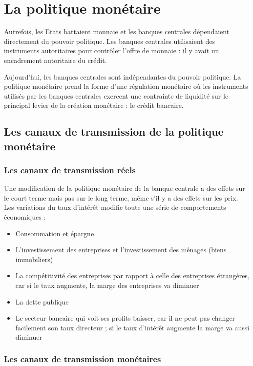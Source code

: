 \chapter{La politique monétaire}

Autrefois, les Etats battaient monnaie et les banques centrales dépendaient directement du pouvoir politique. Les banques centrales utilisaient des instruments autoritaires pour contrôler l'offre de monnaie : il y avait un encadrement autoritaire du crédit.

Aujourd'hui, les banques centrales sont indépendantes du pouvoir politique. La politique monétaire prend la forme d'une régulation monétaire où les instruments utilisés par les banques centrales exercent une contrainte de liquidité sur le principal levier de la création monétaire : le crédit bancaire.

\section{Les canaux de transmission de la politique monétaire}

	\subsection{Les canaux de transmission réels}

Une modification de la politique monétaire de la banque centrale a des effets sur le court terme mais pas sur le long terme, même s'il y a des effets sur les prix.  Les variations du taux d'intérêt modifie toute une série de comportements économiques :

\begin{itemize}
	\item Consommation et épargne
	\item L'investissement des entreprises et l'investissement des ménages (biens immobiliers)
	\item La compétitivité des entreprises par rapport à celle des entreprises étrangères, car si le taux augmente, la marge des entreprises va diminuer
	\item La dette publique
	\item Le secteur bancaire qui voit ses profits baisser, car il ne peut pas changer facilement son taux directeur ; si le taux d'intérêt augmente la marge va aussi diminuer
\end{itemize}

	\subsection{Les canaux de transmission monétaires}
	
